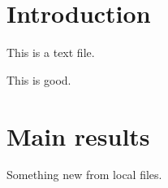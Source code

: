 \documentclass{article}
\begin{document}
\section{Introduction}%
\label{sec:introduction}


This is a text file. 


This is good. 




\section{Main results}%
\label{sec:main_results}

Something new from local files. 
\end{document}
